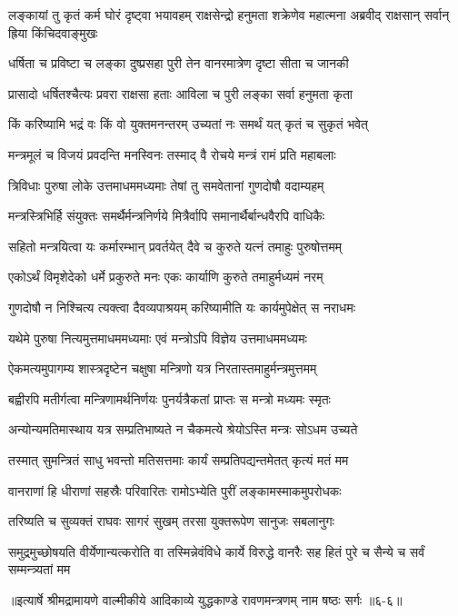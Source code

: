 
\threelineshloka
{लङ्कायां तु कृतं कर्म घोरं दृष्ट्वा भयावहम्}
{राक्षसेन्द्रो हनुमता शक्रेणेव महात्मना}
{अब्रवीद् राक्षसान् सर्वान् ह्रिया किंचिदवाङ्मुखः} %

\twolineshloka
{धर्षिता च प्रविष्टा च लङ्का दुष्प्रसहा पुरी}
{तेन वानरमात्रेण दृष्टा सीता च जानकी} %

\twolineshloka
{प्रासादो धर्षितश्चैत्यः प्रवरा राक्षसा हताः}
{आविला च पुरी लङ्का सर्वा हनुमता कृता} %

\twolineshloka
{किं करिष्यामि भद्रं वः किं वो युक्तमनन्तरम्}
{उच्यतां नः समर्थं यत् कृतं च सुकृतं भवेत्} %

\twolineshloka
{मन्त्रमूलं च विजयं प्रवदन्ति मनस्विनः}
{तस्माद् वै रोचये मन्त्रं रामं प्रति महाबलाः} %

\twolineshloka
{त्रिविधाः पुरुषा लोके उत्तमाधममध्यमाः}
{तेषां तु समवेतानां गुणदोषौ वदाम्यहम्} %

\twolineshloka
{मन्त्रस्त्रिभिर्हि संयुक्तः समर्थैर्मन्त्रनिर्णये}
{मित्रैर्वापि समानार्थैर्बान्धवैरपि वाधिकैः} %

\twolineshloka
{सहितो मन्त्रयित्वा यः कर्मारम्भान् प्रवर्तयेत्}
{दैवे च कुरुते यत्नं तमाहुः पुरुषोत्तमम्} %

\twolineshloka
{एकोऽर्थं विमृशेदेको धर्मे प्रकुरुते मनः}
{एकः कार्याणि कुरुते तमाहुर्मध्यमं नरम्} %

\twolineshloka
{गुणदोषौ न निश्चित्य त्यक्त्वा दैवव्यपाश्रयम्}
{करिष्यामीति यः कार्यमुपेक्षेत् स नराधमः} %

\twolineshloka
{यथेमे पुरुषा नित्यमुत्तमाधममध्यमाः}
{एवं मन्त्रोऽपि विज्ञेय उत्तमाधममध्यमः} %

\twolineshloka
{ऐकमत्यमुपागम्य शास्त्रदृष्टेन चक्षुषा}
{मन्त्रिणो यत्र निरतास्तमाहुर्मन्त्रमुत्तमम्} %

\twolineshloka
{बह्वीरपि मतीर्गत्वा मन्त्रिणामर्थनिर्णयः}
{पुनर्यत्रैकतां प्राप्तः स मन्त्रो मध्यमः स्मृतः} %

\twolineshloka
{अन्योन्यमतिमास्थाय यत्र सम्प्रतिभाष्यते}
{न चैकमत्ये श्रेयोऽस्ति मन्त्रः सोऽधम उच्यते} %

\twolineshloka
{तस्मात् सुमन्त्रितं साधु भवन्तो मतिसत्तमाः}
{कार्यं सम्प्रतिपद्यन्तमेतत् कृत्यं मतं मम} %

\twolineshloka
{वानराणां हि धीराणां सहस्रैः परिवारितः}
{रामोऽभ्येति पुरीं लङ्कामस्माकमुपरोधकः} %

\twolineshloka
{तरिष्यति च सुव्यक्तं राघवः सागरं सुखम्}
{तरसा युक्तरूपेण सानुजः सबलानुगः} %

\threelineshloka
{समुद्रमुच्छोषयति वीर्येणान्यत्करोति वा}
{तस्मिन्नेवंविधे कार्ये विरुद्धे वानरैः सह}
{हितं पुरे च सैन्ये च सर्वं सम्मन्त्र्यतां मम} %


॥इत्यार्षे श्रीमद्रामायणे वाल्मीकीये आदिकाव्ये युद्धकाण्डे रावणमन्त्रणम् नाम षष्ठः सर्गः ॥६-६॥
